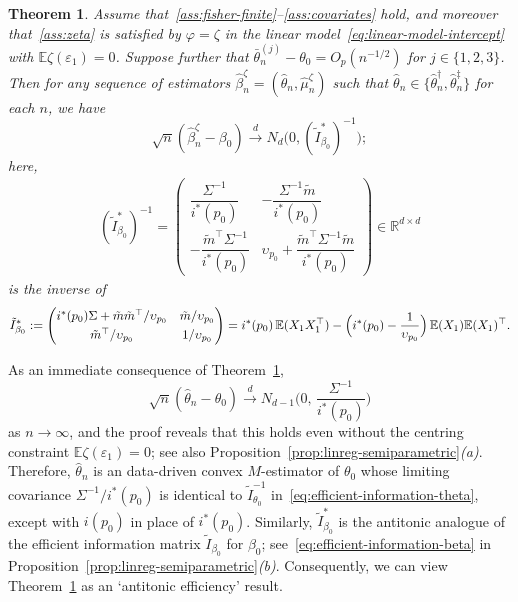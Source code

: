 \documentclass[a4paper]{article}
\newcommand{\R}{\mathbb{R}}
\newcommand{\E}{\mathbb{E}}
\newcommand{\cvd}{\overset{d}{\to}}
\newtheorem{theorem}{Theorem}
\theoremstyle{definition}
\begin{document}
\begin{theorem}
\label{thm:linreg-score-intercept}
Assume that~\emph{\ref{ass:fisher-finite}--\ref{ass:covariates}} hold, and moreover that~\emph{\ref{ass:zeta}} is satisfied by $\varphi = \zeta$ in the linear model~\eqref{eq:linear-model-intercept} with $\E\zeta(\varepsilon_1) = 0$. Suppose further that $\bar{\theta}_n^{(j)} - \theta_0 = O_p(n^{-1/2})$ for $j \in \{1,2,3\}$. Then for any sequence of estimators $\hat{\beta}_n^\zeta = (\hat{\theta}_n,\hat{\mu}_n^\zeta)$ such that $\hat{\theta}_n \in \{\hat{\theta}_n^\dagger,\hat{\theta}_n^\ddagger\}$ for each $n$, we have
\[
\sqrt{n}(\hat{\beta}_n^\zeta - \beta_0) \cvd N_d\bigl(0, (\tilde{I}_{\beta_0}^*)^{-1}\bigr);
\]
here,
\begin{align}
\label{eq:antitonic-efficient-information-beta}
(\tilde{I}_{\beta_0}^*)^{-1} =
\begin{pmatrix}
\dfrac{\Sigma^{-1}}{i^*(p_0)} & -\dfrac{\Sigma^{-1}\tilde{m}}{i^*(p_0)} \\[12pt]
-\dfrac{\tilde{m}^\top\Sigma^{-1}}{i^*(p_0)} & \upsilon_{p_0} + \dfrac{\tilde{m}^\top\Sigma^{-1}\tilde{m}}{i^*(p_0)}
\end{pmatrix}
\in \R^{d \times d}
\end{align}
is the inverse of
\[
\tilde{I}_{\beta_0}^* := 
\begin{pmatrix}
i^*(p_0)\Sigma + \tilde{m}\tilde{m}^\top/\upsilon_{p_0} & \tilde{m}/\upsilon_{p_0} \\[3pt]
\tilde{m}^\top/\upsilon_{p_0} & 1/\upsilon_{p_0}
\end{pmatrix} = i^*(p_0)\,\E(X_1 X_1^\top) - \Bigl(i^*(p_0) - \frac{1}{\upsilon_{p_0}}\Bigr)\,\E(X_1)\E(X_1)^\top.
\]
\end{theorem}

As an immediate consequence of Theorem~\ref{thm:linreg-score-intercept},
\begin{equation}
\label{eq:thetahat}
\sqrt{n}(\hat{\theta}_n - \theta_0) \cvd N_{d-1}\biggl(0,\,\frac{\Sigma^{-1}}{i^*(p_0)}\biggr)
\end{equation}
as $n \to \infty$, and the proof reveals that this holds even without the centring constraint $\E\zeta(\varepsilon_1) = 0$; see also Proposition~\ref{prop:linreg-semiparametric}\textit{(a)}. Therefore, $\hat{\theta}_n$ is an data-driven convex $M$-estimator of $\theta_0$ whose limiting covariance $\Sigma^{-1}/i^*(p_0)$ is identical to $\tilde{I}_{\theta_0}^{-1}$ in~\eqref{eq:efficient-information-theta}, except with $i(p_0)$ in place of $i^*(p_0)$. Similarly, $\tilde{I}_{\beta_0}^*$ is the antitonic analogue of the efficient information matrix $\tilde{I}_{\beta_0}$ for $\beta_0$; see~\eqref{eq:efficient-information-beta} in Proposition~\ref{prop:linreg-semiparametric}\textit{(b)}. Consequently, we can view Theorem~\ref{thm:linreg-score-intercept} as an `antitonic efficiency' result. 
\end{document}
